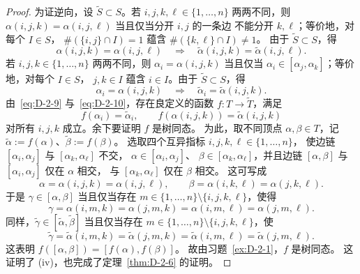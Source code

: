 \begin{proof}
为证逆向，设 $\widetilde S\subset S$。若
$i,j,k,\ell\in\{1,\ldots,n\}$ 两两不同，则
$\alpha(i,j,k)=\alpha(i,j,\ell)$ 当且仅当分开 $i,j$ 的一条边
不能分开 $k,\ell$；等价地，对每个 $I\in S$，
$\#(\{i,j\}\cap I)=1$ 蕴含
$\#(\{k,\ell\}\cap I)\ne1$。
由于 $\widetilde S\subset S$，得
\begin{equation}\label{eq:D-2-9}
  \alpha(i,j,k)=\alpha(i,j,\ell)
  \quad\Longrightarrow\quad
  \widetilde\alpha(i,j,k)=\widetilde\alpha(i,j,\ell).
\end{equation}
若 $i,j,k\in\{1,\ldots,n\}$ 两两不同，则
$\alpha_i=\alpha(i,j,k)$ 当且仅当
$\alpha_i\in[\alpha_j,\alpha_k]$；等价地，对每个 $I\in S$，
$j,k\in I$ 蕴含 $i\in I$。由于 $\widetilde S\subset S$，得
\begin{equation}\label{eq:D-2-10}
  \alpha_i=\alpha(i,j,k)
  \quad\Longrightarrow\quad
  \widetilde\alpha_i=\widetilde\alpha(i,j,k).
\end{equation}
由~\eqref{eq:D-2-9} 与~\eqref{eq:D-2-10}，存在良定义的函数
$f:T\to\widetilde T$，满足
\[
  f(\alpha_i)=\widetilde\alpha_i,\qquad
  f(\alpha(i,j,k))=\widetilde\alpha(i,j,k)
\]
对所有 $i,j,k$ 成立。余下要证明 $f$ 是树同态。
为此，取不同顶点 $\alpha,\beta\in T$，记
$\widetilde\alpha:=f(\alpha)$、$\widetilde\beta:=f(\beta)$。
选取四个互异指标 $i,j,k,\ell\in\{1,\ldots,n\}$，
使边链 $[\alpha_i,\alpha_j]$ 与 $[\alpha_k,\alpha_\ell]$ 不交，
$\alpha\in[\alpha_i,\alpha_j]$、
$\beta\in[\alpha_k,\alpha_\ell]$，并且边链 $[\alpha,\beta]$
与 $[\alpha_i,\alpha_j]$ 仅在 $\alpha$ 相交，
与 $[\alpha_k,\alpha_\ell]$ 仅在 $\beta$ 相交。
这可写成
\[
  \alpha=\alpha(i,j,k)=\alpha(i,j,\ell),\qquad
  \beta=\alpha(i,k,\ell)=\alpha(j,k,\ell).
\]
于是 $\gamma\in[\alpha,\beta]$ 当且仅当存在
$m\in\{1,\ldots,n\}\setminus\{i,j,k,\ell\}$，使得
\[
  \gamma=\alpha(i,m,k)=\alpha(j,m,k)
       =\alpha(i,m,\ell)=\alpha(j,m,\ell).
\]
同样，$\widetilde\gamma\in[\widetilde\alpha,\widetilde\beta]$
当且仅当存在 $m\in\{1,\ldots,n\}\setminus\{i,j,k,\ell\}$，使
\[
  \widetilde\gamma
  =\widetilde\alpha(i,m,k)=\widetilde\alpha(j,m,k)
  =\widetilde\alpha(i,m,\ell)=\widetilde\alpha(j,m,\ell).
\]
这表明 $f([\alpha,\beta])=[f(\alpha),f(\beta)]$。
故由习题~\ref{ex:D-2-1}，$f$ 是树同态。
这证明了 (iv)，也完成了定理~\ref{thm:D-2-6} 的证明。
\end{proof}
